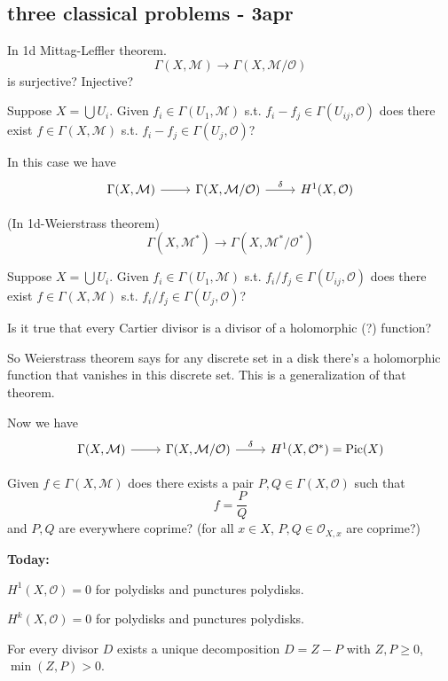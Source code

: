 \documentclass{article}
\newcommand{\Mc}{\mathcal{M}}
\newcommand{\Oc}{\mathcal{O}}
\DeclareMathOperator{\Pic}{Pic}
\begin{document}
\subsection{three classical problems - 3apr}
\begin{question}
	In 1d Mittag-Leffler theorem.
	\[\Gamma(X,\Mc)\to\Gamma(X,\Mc/\Oc)\]
	is surjective? Injective?
	
	Suppose $X=\bigcup U_i$. Given $f_i\in\Gamma(U_1,\Mc)$ s.t. $f_i-f_j\in\Gamma(U_{ij},\Oc)$ does there exist $f\in\Gamma(X,\Mc)$ s.t. $f_i-f_j\in\Gamma(U_{j},\Oc)$?
	
	In this case we have
	\[\begin{tikzcd}
		\Gamma(X,\Mc)\arrow[r]&\Gamma(X,\Mc/\Oc)\arrow[r,"\delta"]&H^1(X,\Oc)
	\end{tikzcd}\]
\end{question}
\begin{question}
	(In 1d-Weierstrass theorem)
	\[\Gamma(X,\Mc^*)\to\Gamma(X,\Mc^*/\Oc^*)\]
	
	Suppose $X=\bigcup U_i$. Given $f_i\in\Gamma(U_1,\Mc)$ s.t. $f_i/f_j\in\Gamma(U_{ij},\Oc)$ does there exist $f\in\Gamma(X,\Mc)$ s.t. $f_i/f_j\in\Gamma(U_{j},\Oc)$?
	
	Is it true that every Cartier divisor is a divisor of a {\color{cyan}holomorphic (?)} function?
	
	So Weierstrass theorem says for any discrete set in a disk there's a holomorphic function that vanishes in this discrete set. This is a generalization of that theorem.
	
	Now we have
	\[\begin{tikzcd}
		\Gamma(X,\Mc)\arrow[r]&\Gamma(X,\Mc/\Oc)\arrow[r,"\delta"]&H^1(X,\Oc^*)=\Pic(X)
	\end{tikzcd}\]
\end{question}
\begin{question}
	Given $f\in\Gamma(X,\Mc)$ does there exists a pair $P,Q\in\Gamma(X,\Oc)$ such that
	\[f=\frac{P}{Q}\]
	and $P,Q$ are everywhere coprime? (for all $x\in X$, $P,Q\in\Oc_{X,x}$ are coprime?) 
\end{question}
\textbf{Today:}
\begin{claim}
	$H^1(X,\Oc)=0$ for polydisks and punctures polydisks.
\end{claim}
\begin{coro}
	$H^k(X,\Oc)=0$ for polydisks and punctures polydisks.
\end{coro}
\begin{lemma}
	For every divisor $D$ exists a unique decomposition $D=Z-P$ with $Z,P\geq0$, $\min(Z,P)>0$.
\end{lemma}
\end{document}
